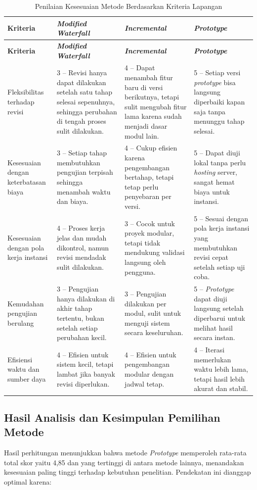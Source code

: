 \begin{longtable}{|p{}|p{}|p{}|p{}|}
	\caption{Penilaian Kesesuaian Metode Berdasarkan Kriteria Lapangan}
	\label{table:3.penilaianmetode}\\
	\hline
	\textbf{Kriteria} & \textbf{\textit{Modified Waterfall}} & \textbf{\textit{Incremental}} & \textbf{\textit{Prototype}} \\
	\hline
	\endfirsthead
	\hline
	\textbf{Kriteria} & \textbf{\textit{Modified Waterfall}} & \textbf{\textit{Incremental}} & \textbf{\textit{Prototype}} \\
	\hline
	\endhead
	Fleksibilitas terhadap revisi & 3 -- Revisi hanya dapat dilakukan setelah satu tahap selesai sepenuhnya, sehingga perubahan di tengah proses sulit dilakukan. & 4 -- Dapat menambah fitur baru di versi berikutnya, tetapi sulit mengubah fitur lama karena sudah menjadi dasar modul lain. & 5 -- Setiap versi \textit{prototype} bisa langsung diperbaiki kapan saja tanpa menunggu tahap selesai. \\
	\hline
	Kesesuaian dengan keterbatasan biaya & 3 -- Setiap tahap membutuhkan pengujian terpisah sehingga menambah waktu dan biaya. & 4 -- Cukup efisien karena pengembangan bertahap, tetapi tetap perlu penyebaran per versi. & 5 -- Dapat diuji lokal tanpa perlu \textit{hosting} server, sangat hemat biaya untuk instansi. \\
	\hline
	Kesesuaian dengan pola kerja instansi & 4 -- Proses kerja jelas dan mudah dikontrol, namun revisi mendadak sulit dilakukan. & 3 -- Cocok untuk proyek modular, tetapi tidak mendukung validasi langsung oleh pengguna. & 5 -- Sesuai dengan pola kerja instansi yang membutuhkan revisi cepat setelah setiap uji coba. \\
	\hline
	Kemudahan pengujian berulang & 3 -- Pengujian hanya dilakukan di akhir tahap tertentu, bukan setelah setiap perubahan kecil. & 3 -- Pengujian dilakukan per modul, sulit untuk menguji sistem secara keseluruhan. & 5 -- \textit{Prototype} dapat diuji langsung setelah diperbarui untuk melihat hasil secara instan. \\
	\hline
	Efisiensi waktu dan sumber daya & 4 -- Efisien untuk sistem kecil, tetapi lambat jika banyak revisi diperlukan. & 4 -- Efisien untuk pengembangan modular dengan jadwal tetap. & 4 -- Iterasi memerlukan waktu lebih lama, tetapi hasil lebih akurat dan stabil. \\
	\hline
\end{longtable}

\subsection{Hasil Analisis dan Kesimpulan Pemilihan Metode} \label{III.HasilAnalisis}
Hasil perhitungan menunjukkan bahwa metode \textit{Prototype} memperoleh rata-rata total skor yaitu 4,85 dan yang tertinggi di antara metode lainnya, menandakan kesesuaian paling tinggi terhadap kebutuhan penelitian. Pendekatan ini dianggap optimal karena:\par


